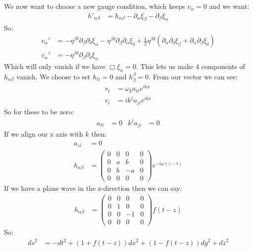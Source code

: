 We now want to choose a new gauge condition, which keeps $v_\alpha = 0$ and  we want:
\begin{align*}
	h'_{\alpha\beta} &= h_{\alpha\beta } - \partial_\alpha \xi_\beta - \partial_\beta \xi_\alpha
\end{align*}
So:
\begin{align*}
	v_\alpha' &= -\eta^{\beta\delta}\partial_\beta\partial_\delta\xi_\alpha - \eta^{\beta\delta}\partial_\beta\partial_\alpha \xi_\delta + \frac{1}{2}\eta^{\beta\delta}(\partial_\alpha\partial_\delta\xi_\beta + \partial_\alpha\partial_\beta \xi_\delta) \\
	v_\alpha' &= -\eta^{\beta\delta}\partial_\beta\partial_\delta\xi_\alpha
\end{align*}
Which will only vanish if we have $\Box\xi_\alpha = 0$. This lets us make 4 components of $h_{\alpha\beta}$ vanish. We choose to set $h_{ti} = 0$ and $h_\beta^\beta = 0$. From our vector we can see:
\begin{align*}
	v_t &= \omega_k a_{tt} e^{ikx} \\
	v_i &= ik^j a_{ji} e^{ikx}
\end{align*}
So for these to be zero:
\begin{align*}
	a_{tt} &= 0 & k^j a_{ji} &= 0
\end{align*}
If we align our z axis with $k$ then:
\begin{align*}
	a_{zi} &= 0 \\
	h_{\alpha\beta} &= \begin{pmatrix}
		0 & 0& 0 & 0 \\
		0 & a & b & 0 \\
		0 & b & -a & 0 \\
		0 & 0 & 0 & 0
	\end{pmatrix} e^{-i\omega (z - t)}
\end{align*}
If we have a plane wave in the z-direction then we can say:
\begin{align*}
	h_{\alpha\beta} &= \begin{pmatrix}
		0 & 0& 0 & 0 \\
		0 & 1 & 0 & 0 \\
		0 & 0 & -1 & 0 \\
		0 & 0 & 0 & 0
	\end{pmatrix} f(t-z)
\end{align*}
So:
\begin{align*}
	ds^2 &= -dt^2 + (1+ f(t-z))dx^2 + (1-f(t-z))dy^2 + dz^2
\end{align*}
